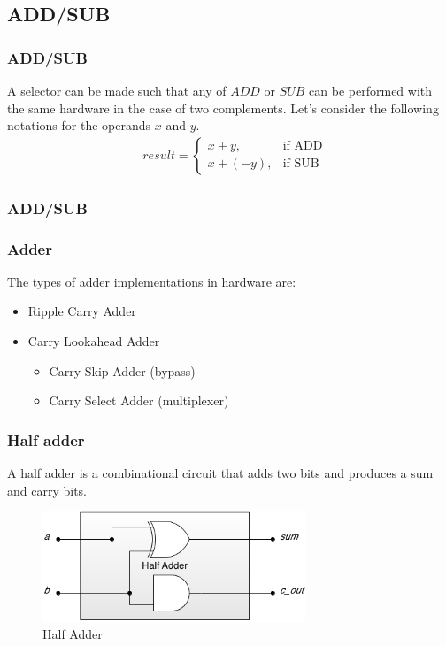 \subsection{ADD/SUB}

\begin{frame}
    \frametitle{ADD/SUB}
 A selector can be made such that any of $ADD$ or $SUB$ can be performed with the same hardware in the case of two complements.
 Let's consider the following notations for the operands $x$ and $y$.
    \begin{equation}
        \begin{aligned}
            &result=
                \begin{cases}
 x+y,& \text{if ADD}\\
 x+(-y), & \text{if SUB}
                \end{cases}
        \end{aligned}
    \end{equation}
\end{frame}

\begin{frame}
    \frametitle{ADD/SUB}
\end{frame}

\begin{frame}
    \frametitle{Adder}
 The types of adder implementations in hardware are:
    \begin{itemize}
        \item Ripple Carry Adder
        \item Carry Lookahead Adder
            \begin{itemize}
                \item Carry Skip Adder (bypass)
                \item Carry Select Adder (multiplexer)
            \end{itemize}
    \end{itemize}
\end{frame}

\begin{frame}
    \frametitle{Half adder}
 A half adder is a combinational circuit that adds two bits and produces a sum and carry bits.
    \begin{figure}
        \centering
        \includegraphics[width=0.7\textwidth]{media/half-adder-gates.png}
        \caption{Half Adder}
    \end{figure}
\end{frame}

